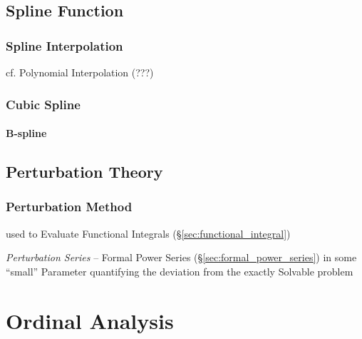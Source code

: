 \subsection{Spline Function}\label{sec:spline}

\subsubsection{Spline Interpolation}\label{sec:spline_interpolation}

cf. Polynomial Interpolation (???) %



\subsubsection{Cubic Spline}\label{sec:cubic_spline}

\paragraph{B-spline}\label{sec:b_spline}\hfill



\subsection{Perturbation Theory}\label{sec:perturbation_theory}

\subsubsection{Perturbation Method}\label{sec:perturbation_method}

used to Evaluate Functional Integrals (\S\ref{sec:functional_integral})

\emph{Perturbation Series} -- Formal Power Series
(\S\ref{sec:formal_power_series}) in some ``small'' Parameter quantifying the
deviation from the exactly Solvable problem



\section{Ordinal Analysis}\label{sec:ordinal_analysis}

